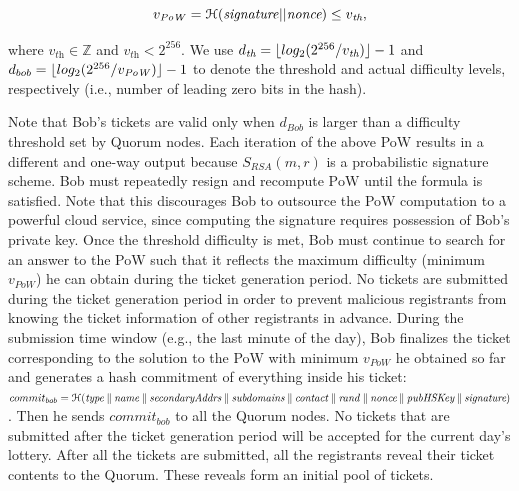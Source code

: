 \documentclass[USenglish,oneside,twocolumn]{article}
\DeclarePairedDelimiter{\floor}{\lfloor}{\rfloor}
\newcommand*\concat{\mathbin{\|}}
\begin{document}
 	\begin{equation}
 	v_{\mathit{PoW}} = \mathcal{H}(\mathit{signature}||\emph{nonce}) \leq v_{\textit{th}},
 	\end{equation}
 	
\noindent where $ v_{\textit{th}} \in \mathbb{Z} $ and $ v_{\textit{th}} < 2^{256} $. We use $ d_{\textit{th}}= \floor{log_2{(2^{256}/v_{\textit{th}})}}-1$ and $ d_{bob}= \floor{log_2{(2^{256}/v_{\mathit{PoW}})}}-1$ to denote the threshold and actual difficulty levels, respectively (i.e., number of leading zero  bits in the hash). %
 
Note that Bob's tickets are valid only when $d_{Bob}$ is larger than a difficulty threshold set by Quorum nodes. Each iteration of the above PoW results in a different and one-way output because  $ S_{\mathit{RSA}}(m, r) $ is a probabilistic signature scheme. Bob must repeatedly resign and recompute $ \mathrm{PoW} $ until the formula is satisfied.  Note that this discourages Bob to outsource the PoW  computation to a powerful cloud service, since computing the signature requires possession of Bob's private key. Once the threshold difficulty is met, Bob must continue to search for an answer to the PoW such that it reflects the maximum difficulty (minimum $v_{\mathit{PoW}}$) he can obtain during the ticket generation period. No tickets are submitted during the ticket generation period in order to prevent malicious registrants from knowing the ticket information of other registrants in advance. During the submission time window (e.g., the last minute of the day), Bob finalizes the ticket corresponding to the solution to the PoW with minimum $v_{\mathit{PoW}}$ he obtained so far and generates a hash commitment of everything inside his ticket: $commit_{bob}=\mathcal{H}(\mathit{type} \concat \mathit{name} \concat \mathit{secondaryAddrs} \concat \mathit{subdomains} \concat \mathit{contact} \concat \mathit{rand}\concat \emph{nonce}\concat\emph{pubHSKey}\concat \emph{signature})$. Then he sends $commit_{bob}$   to all the Quorum nodes. No tickets that are submitted after the ticket generation period will be accepted for the current day's lottery. After all the tickets are submitted, all the registrants reveal their ticket contents to the Quorum. These reveals form an initial pool of tickets.

\end{document}

